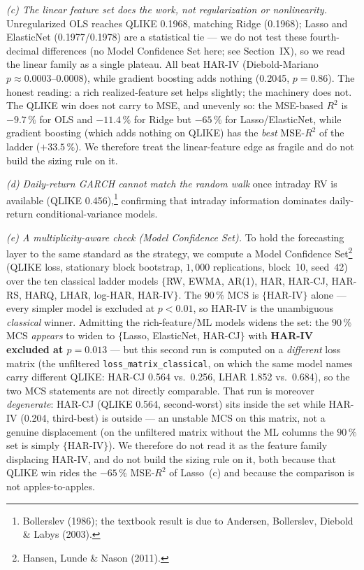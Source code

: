 \documentclass[12pt,a4paper]{article}
\newcommand{\cf}[1]{\footnote{#1}}
\begin{document}
\emph{(c) The linear feature set does the work, not regularization or nonlinearity.} Unregularized
OLS reaches QLIKE 0.1968, matching Ridge (0.1968); Lasso and ElasticNet (0.1977/0.1978) are a
statistical tie --- we do not test these fourth-decimal differences (no Model Confidence Set here;
see Section~IX), so we read the linear family as a single plateau. All beat HAR-IV (Diebold-Mariano
$p\approx0.0003$--$0.0008$), while gradient boosting adds nothing (0.2045, $p=0.86$). The honest
reading: a rich realized-feature set helps slightly; the machinery does not. The QLIKE win does not
carry to MSE, and unevenly so: the MSE-based $R^2$ is $-9.7\,\%$ for OLS and $-11.4\,\%$ for Ridge
but $-65\,\%$ for Lasso/ElasticNet, while gradient boosting (which adds nothing on QLIKE) has the
\emph{best} MSE-$R^2$ of the ladder ($+33.5\,\%$). We therefore treat the linear-feature edge as
fragile and do not build the sizing rule on it.

\emph{(d) Daily-return GARCH cannot match the random walk} once intraday RV is available (QLIKE
0.456),\cf{Bollerslev (1986); the textbook result is due to Andersen, Bollerslev, Diebold \& Labys
(2003).} confirming that intraday information dominates daily-return conditional-variance models.

\emph{(e) A multiplicity-aware check (Model Confidence Set).} To hold the forecasting layer to the
same standard as the strategy, we compute a Model Confidence Set\cf{Hansen, Lunde \& Nason (2011).}
(QLIKE loss, stationary block bootstrap, $1{,}000$ replications, block~10, seed~42) over the ten
classical ladder models $\{$RW, EWMA, AR(1), HAR, HAR-CJ, HAR-RS, HARQ, LHAR, log-HAR, HAR-IV$\}$.
The $90\,\%$ MCS is $\{$HAR-IV$\}$ alone --- every simpler model is excluded at $p<0.01$, so HAR-IV
is the unambiguous \emph{classical} winner. Admitting the rich-feature/ML models widens the set: the
$90\,\%$ MCS \emph{appears} to widen to $\{$Lasso, ElasticNet, HAR-CJ$\}$ with \textbf{HAR-IV excluded at $p=0.013$} --- but this second run is computed on a \emph{different} loss matrix (the unfiltered \texttt{loss\_matrix\_classical}, on which the same model names carry different QLIKE: HAR-CJ 0.564 vs.\ 0.256, LHAR 1.852 vs.\ 0.684), so the two MCS statements are not directly comparable. That run is moreover \emph{degenerate}: HAR-CJ (QLIKE 0.564, second-worst) sits inside the set while HAR-IV (0.204, third-best) is outside --- an unstable MCS on this matrix, not a genuine displacement (on the unfiltered matrix without the ML columns the $90\,\%$ set is simply $\{$HAR-IV$\}$). We therefore do not read it as the feature family displacing HAR-IV, and do not build the sizing rule on it, both because that QLIKE win rides the $-65\,\%$ MSE-$R^2$ of Lasso~(c) and because the comparison is not apples-to-apples.
\end{document}
